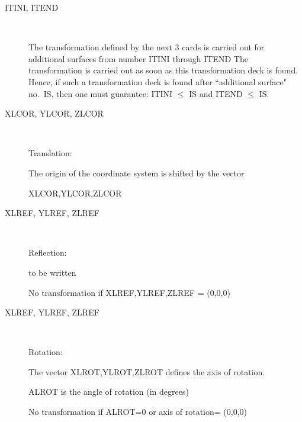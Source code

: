 \begin{description}
  \item[ITINI, ITEND] ~ 

        The transformation defined by the next 3 cards is carried out for additional
        surfaces from number ITINI through ITEND The transformation is carried out as
        soon as this transformation deck is found.
        Hence, if such a transformation deck is found after ``additional surface" no.\
        IS, then one must guarantee: ITINI $\le$ IS and ITEND $\le$ IS.

  \item[XLCOR, YLCOR, ZLCOR] ~ 

        Translation:

        The origin of the coordinate system is shifted by the vector

        XLCOR,YLCOR,ZLCOR
  \item[XLREF, YLREF, ZLREF] ~ 

        Reflection:

        to be written

        No transformation if XLREF,YLREF,ZLREF = (0,0,0)
  \item[XLREF, YLREF, ZLREF] ~

        Rotation:

        The vector XLROT,YLROT,ZLROT defines the axis of rotation.

        ALROT is the angle of rotation (in degrees)

        No transformation if ALROT=0 or axis of rotation= (0,0,0)
\end{description}
